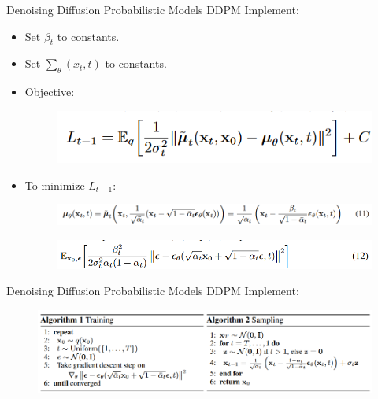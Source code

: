 \documentclass[notheorems, aspectratio=54]{beamer}
\begin{document}
\begin{frame}{Denoising Diffusion Probabilistic Models}
  DDPM Implement:
  \begin{itemize}
    \item Set ${\beta}_t$ to constants.
    \item Set $\sum_{\theta} (x_t,t)$ to constants.
    \item Objective:
    \begin{figure}[!h]
      \centering
      \includegraphics[width=0.7\linewidth]{figures/ddpm_formulation8.png}
    \end{figure}
    \item To minimize $L_{t-1}$:
    \begin{figure}[!h]
      \centering
      \includegraphics[width=1.0\linewidth]{figures/ddpm_formulation11.png}
    \end{figure}
    \begin{figure}[!h]
      \centering
      \includegraphics[width=1.0\linewidth]{figures/ddpm_formulation12.png}
    \end{figure}
  \end{itemize}
\end{frame}

\begin{frame}{Denoising Diffusion Probabilistic Models}
  DDPM Implement:
  \begin{figure}[!h]
    \centering
    \includegraphics[width=1.0\linewidth]{figures/ddpm_algorithm.png}
  \end{figure}
\end{frame}
\end{document}

